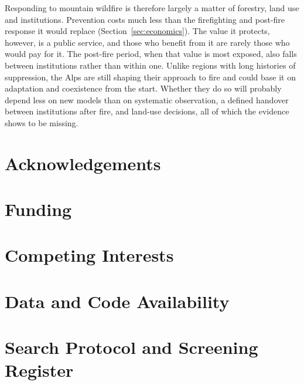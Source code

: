 \documentclass[11pt,a4paper]{article}
\begin{document}
Responding to mountain wildfire is therefore largely a matter of forestry, land use and institutions. Prevention costs much less than the firefighting and post-fire response it would replace (Section~\ref{sec:economics}). The value it protects, however, is a public service, and those who benefit from it are rarely those who would pay for it. The post-fire period, when that value is most exposed, also falls between institutions rather than within one. Unlike regions with long histories of suppression, the Alps are still shaping their approach to fire and could base it on adaptation and coexistence from the start. Whether they do so will probably depend less on new models than on systematic observation, a defined handover between institutions after fire, and land-use decisions, all of which the evidence shows to be missing.


\section*{Acknowledgements}

\section*{Funding}

\section*{Competing Interests}

\section*{Data and Code Availability}


\appendix

\section{Search Protocol and Screening Register}
\label{app:protocol}
\end{document}
